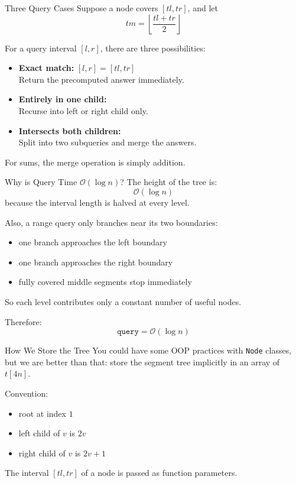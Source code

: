 \documentclass[aspectratio=169]{beamer}
\begin{document}
\begin{frame}{Three Query Cases}
    Suppose a node covers \([tl,tr]\), and let
    $$
    tm = \left\lfloor \frac{tl+tr}{2} \right\rfloor
    $$

    For a query interval \([l,r]\), there are three possibilities:
    \begin{itemize}
        \item \textbf{Exact match:} \([l,r] = [tl,tr]\) \\
        Return the precomputed answer immediately.
        \item \textbf{Entirely in one child:} \\
        Recurse into left or right child only.
        \item \textbf{Intersects both children:} \\
        Split into two subqueries and merge the answers.
    \end{itemize}

    For sums, the merge operation is simply addition.
\end{frame}

\begin{frame}{Why is Query Time \(\mathcal{O}(\log n)\)?}
    The height of the tree is:
    $$
    \mathcal{O}(\log n)
    $$
    because the interval length is halved at every level.

    Also, a range query only branches near its two boundaries:
    \begin{itemize}
        \item one branch approaches the left boundary
        \item one branch approaches the right boundary
        \item fully covered middle segments stop immediately
    \end{itemize}

    So each level contributes only a constant number of useful nodes.

    Therefore:
    $$
    \texttt{query} = \mathcal{O}(\log n)
    $$
\end{frame}

\begin{frame}{How We Store the Tree}
    You could have some OOP practices with \texttt{Node} classes, but we are better than that: store the segment tree implicitly in an array of $t[4n]$.

    Convention:
    \begin{itemize}
        \item root at index \(1\)
        \item left child of \(v\) is \(2v\)
        \item right child of \(v\) is \(2v+1\)
    \end{itemize}

    The interval \([tl,tr]\) of a node is passed as function parameters.
\end{frame}
\end{document}
